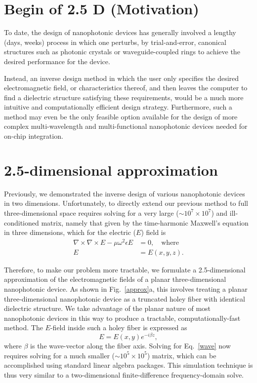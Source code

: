 \section{Begin of 2.5 D (Motivation)}
To date, the design of nanophotonic devices has generally involved a lengthy (days, weeks) process in which one perturbs, by trial-and-error, canonical structures such as photonic crystals or waveguide-coupled rings to achieve the desired performance for the device. 

Instead, an inverse design method in which the user only specifies the desired electromagnetic field, or characteristics thereof, and then leaves the computer to find a dielectric structure satisfying these requirements, would be a much more intuitive and computationally efficient design strategy. Furthermore, such a method may even be the only feasible option available for the design of more complex multi-wavelength and multi-functional nanophotonic devices needed for on-chip integration\cite{miller}.

\section{2.5-dimensional approximation}
Previously, we demonstrated the inverse design of various nanophotonic devices in two dimensions\cite{prevwork}.
Unfortunately, to directly extend our previous method to full three-dimensional space requires solving for a very large ($\sim 10^7 \times 10^7$) and ill-conditioned matrix, namely that given by the time-harmonic Maxwell's equation in three dimensions, which for the electric ($E$) field is
\begin{align}
\nabla\times\nabla\times E - \mu\omega^2\epsilon E &= 0,\quad\text{where}\label{wave} \\
E &= E(x,y,z).
\end{align}

Therefore, to make our problem more tractable, we formulate a 2.5-dimensional approximation of the electromagnetic fields of a planar three-dimensional nanophotonic device. As shown in Fig.~\ref{approx}a, this involves treating a planar three-dimensional nanophotonic device as a truncated holey fiber with identical dielectric structure. We take advantage of the planar nature of most nanophotonic devices in this way to produce a tractable, computationally-fast method. The $E$-field inside such a holey fiber is expressed as
\begin{equation}
E = E(x,y)e^{-i\beta z},
\end{equation}
where $\beta$ is the wave-vector along the fiber axis. Solving for Eq.~\ref{wave} now requires solving for a much smaller ($\sim 10^5 \times 10^5$) matrix, which can be accomplished using standard linear algebra packages. This simulation technique is thus very similar to a two-dimensional finite-difference frequency-domain solve.

